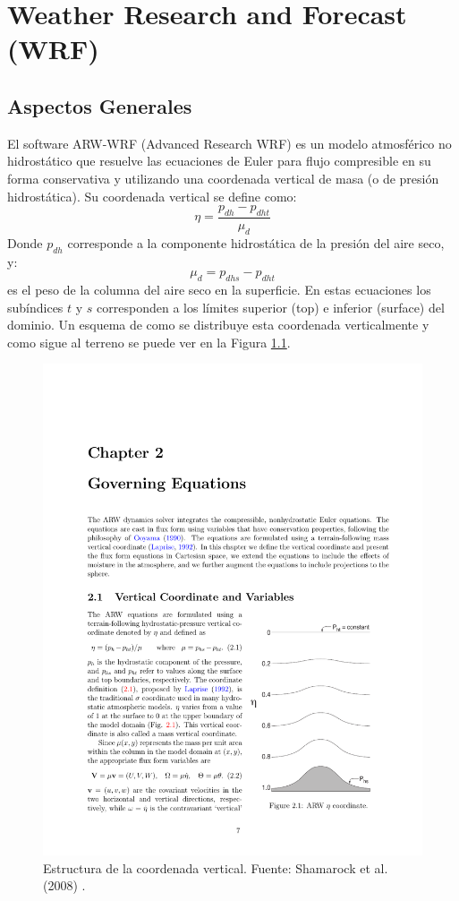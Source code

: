\chapter{Weather Research and Forecast (WRF)}
\section{Aspectos Generales}
El software ARW-WRF (Advanced Research WRF) es un modelo atmosférico no hidrostático que resuelve las ecuaciones de Euler para flujo compresible en su forma conservativa y utilizando una coordenada vertical de masa (o de presión hidrostática). Su coordenada vertical se define como:
\begin{equation}\label{eq:04_eta}
\eta = \frac{p_{dh}-p_{dht}}{\mu_d}
\end{equation}
Donde $p_{dh}$ corresponde a la componente hidrostática de la presión del aire seco, y:
\begin{equation}
\mu_d = p_{dhs} - p_{dht}
\end{equation}
es el peso de la columna del aire seco en la superficie. En estas ecuaciones los subíndices $t$ y $s$ corresponden a los límites superior (top) e inferior (surface) del dominio. Un esquema de como se distribuye esta coordenada verticalmente y como sigue al terreno se puede ver en la Figura \ref{fig:04_eta}.

\begin{figure}[h!]
	\centering
	\includegraphics[width=0.55\linewidth,trim={11.5cm 3.3cm 1cm 14cm},clip]{Imagenes/04/eta}
	\caption{Estructura de la coordenada vertical. Fuente: Shamarock et al. (2008) \cite{https://doi.org/10.5065/d68s4mvh}.}
	\label{fig:04_eta}
\end{figure}

